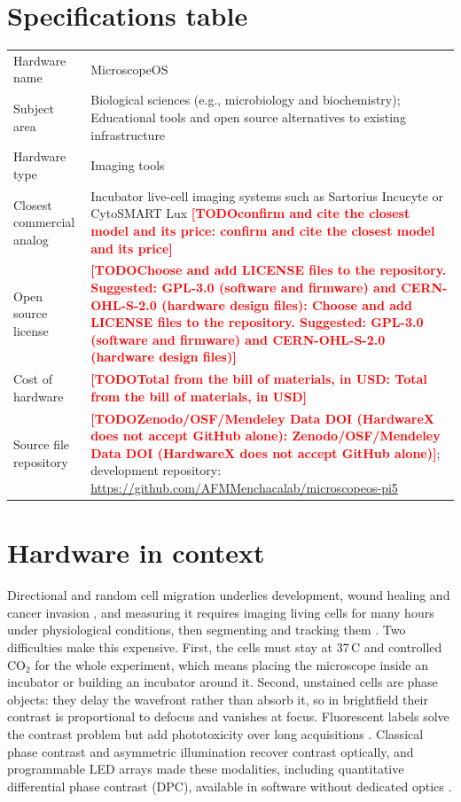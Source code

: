\documentclass[preprint,12pt]{elsarticle}
\DeclareRobustCommand{\TODO}[1]{\textcolor{red}{\textbf{[TODO\ifx\relax#1\relax\else: #1\fi]}}}
\begin{document}
\section*{Specifications table}

\noindent
\begin{tabularx}{\textwidth}{>{\raggedright\arraybackslash}p{}L}
\toprule
Hardware name & MicroscopeOS \\
Subject area & Biological sciences (e.g., microbiology and biochemistry);
  Educational tools and open source alternatives to existing infrastructure \\
Hardware type & Imaging tools \\
Closest commercial analog & Incubator live-cell imaging systems such as
  Sartorius Incucyte or CytoSMART Lux \TODO{confirm and cite the closest
  model and its price} \\
Open source license & \TODO{Choose and add LICENSE files to the repository.
  Suggested: GPL-3.0 (software and firmware) and CERN-OHL-S-2.0 (hardware
  design files)} \\
Cost of hardware & \TODO{Total from the bill of materials, in USD} \\
Source file repository & \TODO{Zenodo/OSF/Mendeley Data DOI (HardwareX does
  not accept GitHub alone)}; development repository:
  \url{https://github.com/AFMMenchacalab/microscopeos-pi5} \\
\bottomrule
\end{tabularx}

\section{Hardware in context}

Directional and random cell migration underlies development, wound healing
and cancer invasion \cite{Ref003}, and measuring it requires imaging living
cells for many hours under physiological conditions, then segmenting and
tracking them \cite{WuWirtz2026Methods}. Two difficulties make this
expensive. First, the cells must stay at 37\,\textdegree C and controlled
CO$_2$ for the whole experiment, which means placing the microscope inside
an incubator or building an incubator around it. Second, unstained cells
are phase objects: they delay the wavefront rather than absorb it, so in
brightfield their contrast is proportional to defocus and vanishes at
focus. Fluorescent labels solve the contrast problem but add phototoxicity
over long acquisitions \cite{Icha2017,Laissue2017}. Classical phase
contrast \cite{Zernike1942} and asymmetric illumination
\cite{Kachar1985,Mehta2009} recover contrast optically, and programmable
LED arrays made these modalities, including quantitative differential phase
contrast (DPC), available in software without dedicated optics
\cite{Zheng2011LED,Liu2014LED,Tian2014DPC3D,Tian2015DPC,Lee2015Color,Chen2018DPCaberr}.
\end{document}
